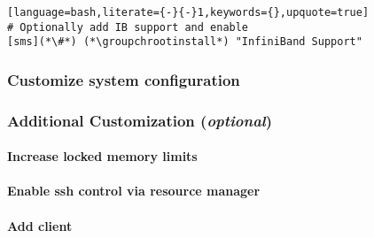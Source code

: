 \documentclass[letterpaper]{article}
\newcommand{\groupchrootinstall}{nodeshell compute dnf -y groupinstall}
\begin{document}
\begin{lstlisting}[language=bash,literate={-}{-}1,keywords={},upquote=true]
# Optionally add IB support and enable
[sms](*\#*) (*\groupchrootinstall*) "InfiniBand Support"
\end{lstlisting}

\vspace*{-0.25cm}
\subsubsection{Customize system configuration} \label{sec:master_customization}




\subsubsection{Additional Customization ({\em optional})} \label{sec:addl_customizations}


\paragraph{Increase locked memory limits}


\paragraph{Enable ssh control via resource manager}


\paragraph{Add \Lustre{} client} \label{sec:lustre_client}



\end{document}
